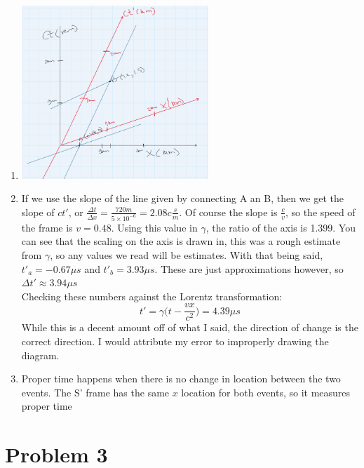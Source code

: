 \documentclass[11pt]{article}
\begin{document}
\begin{enumerate}[label=\alph*)]
    \item 
        \parbox{0}{ \includegraphics[width = 200pt]{Homework06/Homework1.PNG}}

    \item
        If we use the slope of the line given by connecting A an B, then we get the slope of $ct'$, or $\frac{\Delta t}{\Delta x} = \frac{720 m}{5 \times 10^{-6}} = 2.08 c \frac{s}{m}$. Of course the slope is $\frac{c}{v}$, so the speed of the frame is $v = 0.48$. Using this value in $\gamma$, the ratio of the axis is 1.399. You can see that the scaling on the axis is drawn in, this was a rough estimate from $\gamma$, so any values we read will be estimates. With that being said, $t'_a = -0.67 \mu s$ and $t'_b = 3.93 \mu s$. These are just approximations however, so $\Delta t' \approx 3.94 \mu s$\\
        Checking these numbers against the Lorentz transformation:
        \[t' = \gamma \Big(t-\frac{vx}{c^2}\Big)=4.39 \mu s\]
        While this is a decent amount off of what I said, the direction of change is the correct direction. I would attribute my error to improperly drawing the diagram. 
    \item
    Proper time happens when there is no change in location between the two events. The S' frame has the same $x$ location for both events, so it measures proper time
        
\end{enumerate}

\section*{Problem 3}
\end{document}

